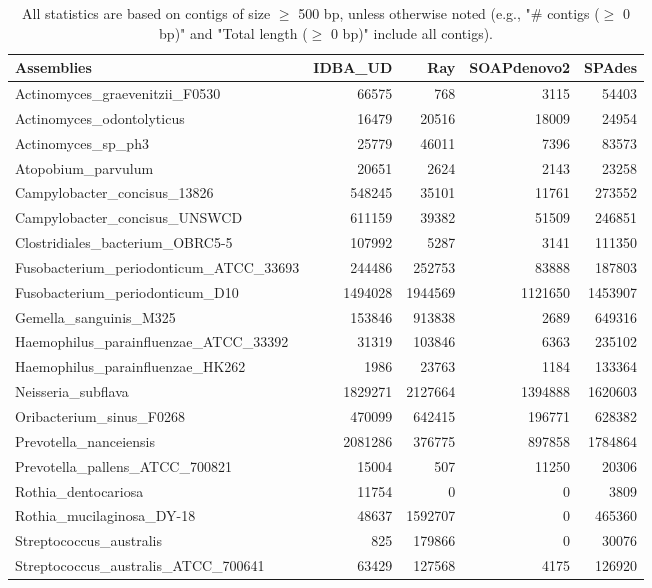 \documentclass[12pt,a4paper]{article}
\begin{document}
\begin{table}[ht]
\begin{center}
\caption{All statistics are based on contigs of size $\geq$ 500 bp, unless otherwise noted (e.g., "\# contigs ($\geq$ 0 bp)" and "Total length ($\geq$ 0 bp)" include all contigs).}
\begin{tabular}{|l*{4}{|r}|}
\hline
Assemblies & IDBA\_UD & Ray & SOAPdenovo2 & SPAdes \\ \hline
Actinomyces\_graevenitzii\_F0530 & 66575 & 768 & 3115 & 54403 \\ \hline
Actinomyces\_odontolyticus & 16479 & 20516 & 18009 & 24954 \\ \hline
Actinomyces\_sp\_ph3 & 25779 & 46011 & 7396 & 83573 \\ \hline
Atopobium\_parvulum & 20651 & 2624 & 2143 & 23258 \\ \hline
Campylobacter\_concisus\_13826 & 548245 & 35101 & 11761 & 273552 \\ \hline
Campylobacter\_concisus\_UNSWCD & 611159 & 39382 & 51509 & 246851 \\ \hline
Clostridiales\_bacterium\_OBRC5-5 & 107992 & 5287 & 3141 & 111350 \\ \hline
Fusobacterium\_periodonticum\_ATCC\_33693 & 244486 & 252753 & 83888 & 187803 \\ \hline
Fusobacterium\_periodonticum\_D10 & 1494028 & 1944569 & 1121650 & 1453907 \\ \hline
Gemella\_sanguinis\_M325 & 153846 & 913838 & 2689 & 649316 \\ \hline
Haemophilus\_parainfluenzae\_ATCC\_33392 & 31319 & 103846 & 6363 & 235102 \\ \hline
Haemophilus\_parainfluenzae\_HK262 & 1986 & 23763 & 1184 & 133364 \\ \hline
Neisseria\_subflava & 1829271 & 2127664 & 1394888 & 1620603 \\ \hline
Oribacterium\_sinus\_F0268 & 470099 & 642415 & 196771 & 628382 \\ \hline
Prevotella\_nanceiensis & 2081286 & 376775 & 897858 & 1784864 \\ \hline
Prevotella\_pallens\_ATCC\_700821 & 15004 & 507 & 11250 & 20306 \\ \hline
Rothia\_dentocariosa & 11754 & 0 & 0 & 3809 \\ \hline
Rothia\_mucilaginosa\_DY-18 & 48637 & 1592707 & 0 & 465360 \\ \hline
Streptococcus\_australis & 825 & 179866 & 0 & 30076 \\ \hline
Streptococcus\_australis\_ATCC\_700641 & 63429 & 127568 & 4175 & 126920 \\ \hline

\end{tabular}
\end{center}
\end{table}
\end{document}
